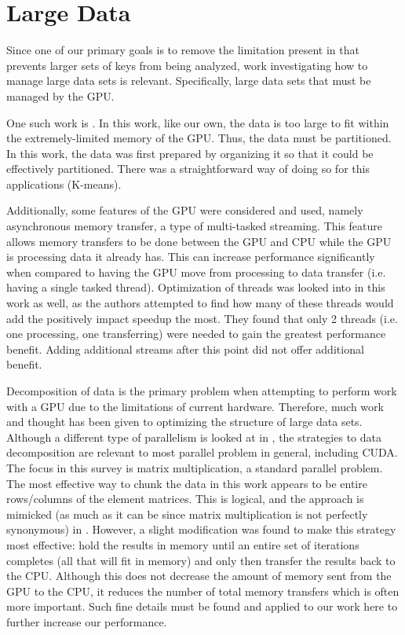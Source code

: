 \documentclass[12pt]{ucthesis}
\begin{document}
\section{Large Data}
Since one of our primary goals is to remove the limitation present in
\cite{scharfglass2012CUDA} that prevents larger sets of keys from being
analyzed, work investigating how to manage large data sets is relevant.
Specifically, large data sets that must be managed by the GPU.

One such work is \cite{wu2009clustering}. In this work, like our own, the data
is too large to fit within the extremely-limited memory of the GPU. Thus, the
data must be partitioned. In this work, the data was first prepared by
organizing it so that it could be effectively partitioned. There was a
straightforward way of doing so for this applications (K-means).

Additionally, some features of the GPU were considered and used, namely
asynchronous memory transfer, a type of multi-tasked streaming. This feature
allows memory transfers to be done between the GPU and CPU while the GPU is
processing data it already has. This can increase performance significantly
when compared to having the GPU move from processing to data transfer (i.e.
having a single tasked thread). Optimization of threads was looked into in this
work as well, as the authors attempted to find how many of these threads would
add the positively impact speedup the most. They found that only 2 threads
(i.e. one processing, one transferring) were needed to gain the greatest
performance benefit. Adding additional streams after this point did not offer
additional benefit.

Decomposition of data is the primary problem when attempting to perform work
with a GPU due to the limitations of current hardware. Therefore, much work and
thought has been given to optimizing the structure of large data sets. Although
a different type of parallelism is looked at in \cite{charles2012chunking}, the
strategies to data decomposition are relevant to most parallel problem in
general, including CUDA. The focus in this survey is matrix multiplication,
a standard parallel problem. The most effective way to chunk the data in this
work appears to be entire rows/columns of the element matrices. This is logical,
and the approach is mimicked (as much as it can be since matrix multiplication
is not perfectly synonymous) in \cite{scharfglass2012CUDA}. However, a slight
modification was found to make this strategy most effective: hold the results
in memory until an entire set of iterations completes (all that will fit in
memory) and only then transfer the results back to the CPU. Although this does
not decrease the amount of memory sent from the GPU to the CPU, it reduces the
number of total memory transfers which is often more important. Such fine
details must be found and applied to our work here to further increase our
performance.
\end{document}
